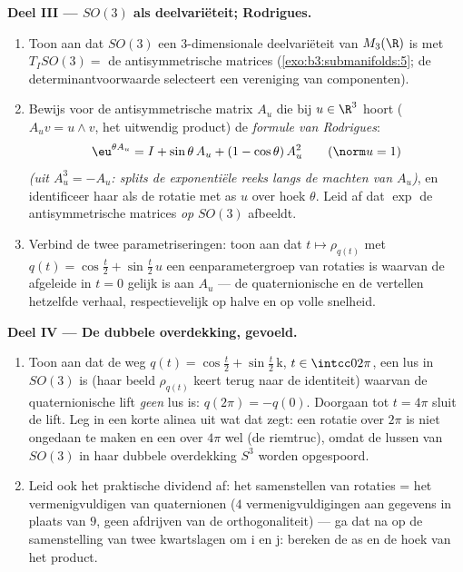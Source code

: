 \begin{problem}
\medskip
\noindent\textbf{Deel III --- $SO(3)$ als deelvariëteit;
Rodrigues.}
\begin{enumerate}[resume]
  \item Toon aan dat $SO(3)$ een  $3$-dimensionale
        deelvariëteit van $M_3(\R)$ is met $T_ISO(3) =$ de
        antisymmetrische matrices
        (\cref{exo:b3:submanifolds:5}; de determinantvoorwaarde
        selecteert een vereniging van componenten).
  \item Bewijs voor de antisymmetrische matrix $A_u$ die bij $u
        \in \R^3$ hoort ($A_uv = u\wedge v$, het uitwendig
        product) de \emph{formule van Rodrigues}:
        \[
        \eu^{\theta A_u} = I + \sin\theta\,A_u + (1 -
        \cos\theta)\,A_u^2 \qquad (\norm u = 1)
        \]
        \emph{(uit $A_u^3 = -A_u$: splits de exponentiële reeks
        langs de machten van $A_u$)}, en identificeer haar als de
        rotatie met as $u$ over hoek $\theta$. Leid af dat $\exp$
        de antisymmetrische matrices \emph{op} $SO(3)$ afbeeldt.
  \item Verbind de twee parametriseringen: toon aan dat $t
        \mapsto \rho_{q(t)}$ met $q(t) = \cos\frac t2 +
        \sin\frac t2\,u$ een eenparametergroep van rotaties is
        waarvan de afgeleide in $t = 0$ gelijk is aan $A_u$ ---
        de quaternionische en de  vertellen
        hetzelfde verhaal, respectievelijk op halve en op volle
        snelheid.
\end{enumerate}

\medskip
\noindent\textbf{Deel IV --- De dubbele overdekking, gevoeld.}
\begin{enumerate}[resume]
  \item Toon aan dat de weg $q(t) = \cos\frac t2 + \sin\frac
        t2\,\mathrm k$, $t \in \intcc0{2\pi}$, een lus in
        $SO(3)$ is (haar beeld $\rho_{q(t)}$ keert terug naar de
        identiteit) waarvan de quaternionische lift \emph{geen}
        lus is: $q(2\pi) = -q(0)$. Doorgaan tot $t = 4\pi$ sluit
        de lift. Leg in een korte alinea uit wat dat zegt: een
        rotatie over $2\pi$ is niet  ongedaan te maken en
        een over $4\pi$ wel (de riemtruc), omdat de lussen van
        $SO(3)$ in haar dubbele overdekking $S^3$ worden
        opgespoord.
  \item Leid ook het praktische dividend af: het samenstellen van
        rotaties = het vermenigvuldigen van quaternionen ($4$
        vermenigvuldigingen aan gegevens in plaats van $9$, geen
        afdrijven van de orthogonaliteit) --- ga dat na op de
        samenstelling van twee kwartslagen om $\mathrm i$ en
        $\mathrm j$: bereken de as en de hoek van het product.
\end{enumerate}


\end{problem}
